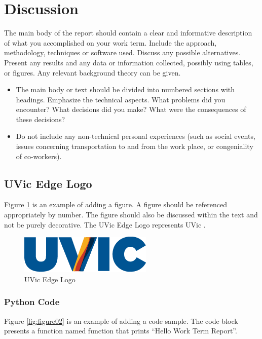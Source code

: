\section{Discussion}
The main body of the report should contain a clear and informative description of what you accomplished on your work term. Include the approach, methodology, techniques or software used. Discuss any possible alternatives. Present any results and any data or information collected, possibly using tables, or figures. Any relevant background theory can be given.

\begin{itemize}
  \item The main body or text should be divided into numbered sections with headings. Emphasize the technical aspects. What problems did you encounter? What decisions did you make? What were the consequences of these decisions?
  \item Do not include any non-technical personal experiences (such as social events, issues concerning transportation to and from the work place, or congeniality of co-workers).
\end{itemize}

\subsection{UVic Edge Logo}
Figure \ref{fig:figure01} is an example of adding a figure. A figure should be referenced appropriately by number. The figure should also be discussed within the text and not be purely decorative. The UVic Edge Logo represents UVic \cite{uvicwebsite}.
\vspace{0.75cm}

\begin{figure}[h!]
  \begin{center}
    \includegraphics[scale=0.75]{figures/figure01.png}
    \caption{UVic Edge Logo}
    \label{fig:figure01}
  \end{center}
\end{figure}

\subsubsection{Python Code}
Figure \ref{fig:figure02} is an example of adding a code sample. The code block presents a function named function that prints ``Hello Work Term Report''.

